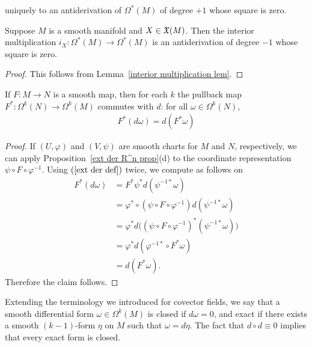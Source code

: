 uniquely to an antiderivation of $\Omega^*(M)$ of degree $+1$ whose square is zero.
\begin{proposition}
Suppose $M$ is a smooth manifold and $X\in\mathfrak{X}(M)$. Then the interior multiplication $i_X:\Omega^*(M)\to\Omega^*(M)$ is an antiderivation of degree $-1$ whose square is zero.
\end{proposition}
\begin{proof}
This follows from Lemma~\ref{interior multiplication lem}.
\end{proof}
\begin{proposition}
If $F:M\to N$ is a smooth map, then for each $k$ the pullback map $F^*:\Omega^k(N)\to\Omega^k(M)$ commutes with $d$: for all $\omega\in\Omega^k(N)$,
\begin{align}\label{ext der naturality}
F^*(d\omega)=d(F^*\omega)
\end{align}
\end{proposition}
\begin{proof}
If $(U,\varphi)$ and $(V,\psi)$ are smooth charts for $M$ and $N$, respectively, we can apply Proposition~\ref{ext der R^n prop}(d) to the coordinate representation $\psi\circ F\circ\varphi^{-1}$. Using $(\ref{ext der def})$ twice, we compute as follows on
\begin{align*}
F^*(d\omega)&=F^*\psi^*d(\psi^{-1*}\omega)\\
&=\varphi^*\circ(\psi\circ F\circ\varphi^{-1})d(\psi^{-1*}\omega)\\
&=\varphi^*d\big((\psi\circ F\circ\varphi^{-1})^*(\psi^{-1*}\omega)\big)\\
&=\varphi^*d(\varphi^{-1*}\circ F^*\omega)\\
&=d(F^*\omega).
\end{align*}
Therefore the claim follows.
\end{proof}
Extending the terminology we introduced for covector fields, we say that a smooth differential form $\omega\in\Omega^k(M)$ is closed if $d\omega=0$, and exact if there exists a smooth $(k-1)$-form $\eta$ on $M$ such that $\omega=d\eta$. The fact that $d\circ d\equiv0$ implies that every exact form is closed.
